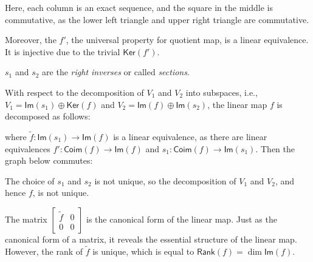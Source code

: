 \documentclass[
	11pt, %
	fleqn, %
	a4paper, %
]{LegrandOrangeBook}
\renewcommand{\ker}[1]{\mathsf{Ker}(#1)} %
\renewcommand{\Im}[1]{\mathsf{Im}(#1)} %
\newcommand{\rank}[1]{\mathsf{Rank}(#1)} %
\newcommand{\coim}[1]{\mathsf{Coim}(#1)} %
\begin{document}
Here, each column is an exact sequence, and the square in the middle is commutative, as the lower left triangle and upper right triangle are commutative.

Moreover, the $f'$, the universal property for quotient map, is a linear equivalence. It is injective due to the trivial $\ker{f'}$. 

$s_1$ and $s_2$ are the \emph{right inverses} or called \emph{sections}.

With respect to the decomposition of $V_1$ and $V_2$ into subspaces, i.e., $V_1 = \Im{s_1} \oplus \ker{f}$ and $V_2 = \Im{f} \oplus \Im{s_2}$, the linear map $f$ is decomposed as follows:
\begin{center}
\end{center}
where $\tilde{f} : \Im{s_1} \to \Im{f}$ is a linear equivalence, as there are linear equivalences $f' : \coim{f} \to \Im{f}$ and $s_1 : \coim{f} \to \Im{s_1}$. Then the graph below commutes:

\begin{center}
\end{center}

\begin{remark}
    The choice of $s_1$ and $s_2$ is not unique, so the decomposition of $V_1$ and $V_2$, and hence $f$, is not unique.
\end{remark}

The matrix $\begin{bmatrix}
    \tilde{f} & 0 \\
    0 & 0
\end{bmatrix}$ is the canonical form of the linear map. Just as the canonical form of a matrix, it reveals the essential structure of the linear map. However, the rank of $\tilde{f}$ is unique, which is equal to $\rank{f} = \dim{\Im{f}}$.
\end{document}
